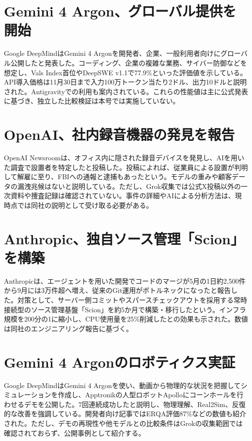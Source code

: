 \section{Gemini 4 Argon、グローバル提供を開始}
Google DeepMindはGemini 4 Argonを開発者、企業、一般利用者向けにグローバル公開したと発表した。コーディング、企業の複雑な業務、サイバー防御などを想定し、Vals Index首位やDeepSWE v1.1で77.9\%といった評価値を示している。API導入価格は11月30日まで入力100万トークン当たり2ドル、出力10ドルと説明された。Antigravityでの利用も案内されている。これらの性能値は主に公式発表に基づき、独立した比較検証は本号では実施していない。

\section{OpenAI、社内録音機器の発見を報告}
OpenAI Newsroomは、オフィス内に隠された録音デバイスを発見し、AIを用いた調査で設置者を特定したと投稿した。投稿によれば、従業員による設置が判明して解雇に至り、FBIへの通報と逮捕もあったという。モデルの重みや顧客データの漏洩兆候はないと説明している。ただし、Grok収集では公式X投稿以外の一次資料や捜査記録は確認されていない。事件の詳細やAIによる分析方法は、現時点では同社の説明として受け取る必要がある。

\section{Anthropic、独自ソース管理「Scion」を構築}
Anthropicは、エージェントを用いた開発でコードのマージが5月の1日約2,500件から9月には3万件超へ増え、従来のGit運用がボトルネックになったと報告した。対策として、サーバー側コミットやスパースチェックアウトを採用する常時接続型のソース管理基盤「Scion」を約5か月で構築・移行したという。インフラ規模を200分の1に縮小し、CPU使用量を25\%削減したとの効果も示された。数値は同社のエンジニアリング報告に基づく。

\section{Gemini 4 Argonのロボティクス実証}
Google DeepMindはGemini 4 Argonを使い、動画から物理的な状況を把握してシミュレーションを作成し、Apptronikの人型ロボットApolloにコーンホールを行わせるデモを公開した。7回連続成功したと説明し、物理理解、Real2Sim、反復的な改善を強調している。開発者向け記事ではERQA評価87\%などの数値も紹介された。ただし、デモの再現性や他モデルとの比較条件はGrokの収集範囲では確認されておらず、公開事例として紹介する。

